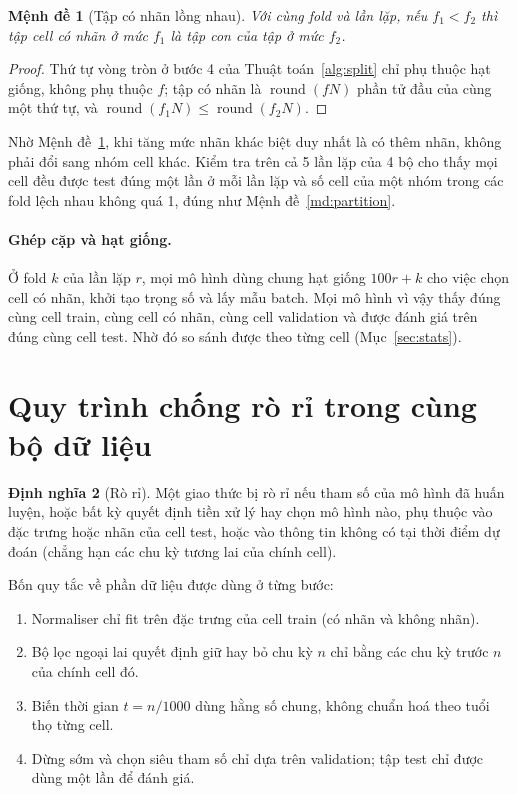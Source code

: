 \documentclass[12pt,a4paper,oneside]{report}
\theoremstyle{plain}
\newtheorem{menhde}{Mệnh đề}[chapter]
\theoremstyle{definition}
\newtheorem{dinhnghia}[menhde]{Định nghĩa}
\begin{document}
\begin{menhde}[Tập có nhãn lồng nhau]\label{md:nested}
Với cùng fold và lần lặp, nếu $f_1 < f_2$ thì tập cell có nhãn ở mức $f_1$ là tập con của tập ở mức $f_2$.
\end{menhde}
\begin{proof}
Thứ tự vòng tròn ở bước 4 của Thuật toán~\ref{alg:split} chỉ phụ thuộc hạt giống, không phụ thuộc $f$; tập có nhãn là $\operatorname{round}(fN)$
phần tử đầu của cùng một thứ tự, và $\operatorname{round}(f_1N) \le \operatorname{round}(f_2N)$.
\end{proof}

Nhờ Mệnh đề~\ref{md:nested}, khi tăng mức nhãn khác biệt duy nhất là có thêm nhãn, không phải đổi sang nhóm cell
khác. Kiểm tra trên cả 5 lần lặp của 4 bộ cho thấy mọi cell đều được test đúng một lần ở mỗi lần lặp và số cell của một nhóm trong các fold lệch nhau không quá 1, đúng như Mệnh đề~\ref{md:partition}.




\paragraph{Ghép cặp và hạt giống.} Ở fold $k$ của lần lặp $r$, mọi mô hình dùng chung hạt giống $100r + k$ cho việc chọn cell có nhãn, khởi tạo
trọng số và lấy mẫu batch. Mọi mô hình vì vậy thấy đúng cùng cell train, cùng cell có nhãn, cùng cell
validation và được đánh giá trên đúng cùng cell test. Nhờ đó so sánh được theo từng cell (Mục~\ref{sec:stats}).

\section{Quy trình chống rò rỉ trong cùng bộ dữ liệu}\label{sec:noleak}

\begin{dinhnghia}[Rò rỉ]
Một giao thức bị rò rỉ nếu tham số của mô hình đã huấn luyện, hoặc bất kỳ quyết định tiền xử lý hay chọn mô
hình nào, phụ thuộc vào đặc trưng hoặc nhãn của cell test, hoặc vào thông tin không có tại thời điểm dự đoán
(chẳng hạn các chu kỳ tương lai của chính cell).
\end{dinhnghia}

Bốn quy tắc về phần dữ liệu được dùng ở từng bước:
\begin{enumerate}
\item Normaliser chỉ fit trên đặc trưng của cell train (có nhãn và không nhãn).
\item Bộ lọc ngoại lai quyết định giữ hay bỏ chu kỳ $n$ chỉ bằng các chu kỳ trước $n$ của chính cell đó.
\item Biến thời gian $t = n/1000$ dùng hằng số chung, không chuẩn hoá theo tuổi thọ từng cell.
\item Dừng sớm và chọn siêu tham số chỉ dựa trên validation; tập test chỉ được dùng một lần để đánh giá.
\end{enumerate}
\end{document}
